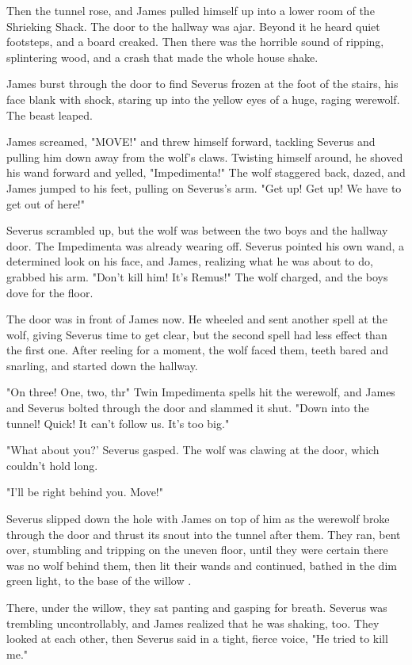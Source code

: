 Then the tunnel rose, and James pulled himself up into a lower room of the Shrieking Shack. The door to the hallway was ajar. Beyond it he heard quiet footsteps, and a board creaked. Then there was the horrible sound of ripping, splintering wood, and a crash that made the whole house shake.

James burst through the door to find Severus frozen at the foot of the stairs, his face blank with shock, staring up into the yellow eyes of a huge, raging werewolf. The beast leaped.

James screamed, "MOVE!" and threw himself forward, tackling Severus and pulling him down away from the wolf's claws. Twisting himself around, he shoved his wand forward and yelled, "Impedimenta!" The wolf staggered back, dazed, and James jumped to his feet, pulling on Severus's arm. "Get up! Get up! We have to get out of here!"

Severus scrambled up, but the wolf was between the two boys and the hallway door. The Impedimenta was already wearing off. Severus pointed his own wand, a determined look on his face, and James, realizing what he was about to do, grabbed his arm. "Don't kill him! It's Remus!" The wolf charged, and the boys dove for the floor.

The door was in front of James now. He wheeled and sent another spell at the wolf, giving Severus time to get clear, but the second spell had less effect than the first one. After reeling for a moment, the wolf faced them, teeth bared and snarling, and started down the hallway.

"On three! One, two, thr{\el}" Twin Impedimenta spells hit the werewolf, and James and Severus bolted through the door and slammed it shut. "Down into the tunnel! Quick! It can't follow us. It's too big."

"What about you?' Severus gasped. The wolf was clawing at the door, which couldn't hold long.

"I'll be right behind you. Move!"

Severus slipped down the hole with James on top of him as the werewolf broke through the door and thrust its snout into the tunnel after them. They ran, bent over, stumbling and tripping on the uneven floor, until they were certain there was no wolf behind them, then lit their wands and continued, bathed in the dim green light, to the base of the willow .

There, under the willow, they sat panting and gasping for breath. Severus was trembling uncontrollably, and James realized that he was shaking, too. They looked at each other, then Severus said in a tight, fierce voice, "He tried to kill me."

